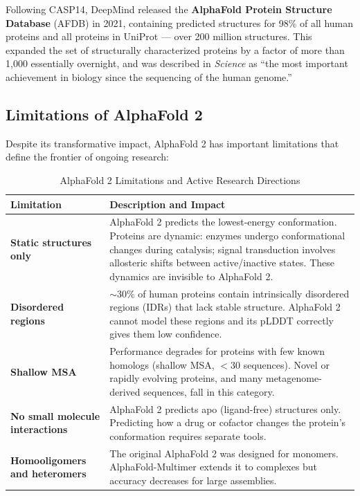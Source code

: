 ﻿\documentclass[12pt,a4paper]{article}
\begin{document}
Following CASP14, DeepMind released the \textbf{AlphaFold Protein Structure Database} (AFDB) in 2021, containing predicted structures for 98\% of all human proteins and all proteins in UniProt --- over 200 million structures. This expanded the set of structurally characterized proteins by a factor of more than 1,000 essentially overnight, and was described in \textit{Science} as ``the most important achievement in biology since the sequencing of the human genome.''

\subsection{Limitations of AlphaFold 2}

Despite its transformative impact, AlphaFold 2 has important limitations that define the frontier of ongoing research:

\begin{table}[H]
\centering
\caption{AlphaFold 2 Limitations and Active Research Directions}
\begin{tabularx}{\textwidth}{>{\bfseries}p{4cm}X}
\toprule
\rowcolor{lightblue}
\textbf{Limitation} & \textbf{Description and Impact} \\
\midrule
Static structures only & AlphaFold 2 predicts the lowest-energy conformation. Proteins are dynamic: enzymes undergo conformational changes during catalysis; signal transduction involves allosteric shifts between active/inactive states. These dynamics are invisible to AlphaFold 2. \\
\addlinespace
\rowcolor{lightblue!20}
Disordered regions & $\sim$30\% of human proteins contain intrinsically disordered regions (IDRs) that lack stable structure. AlphaFold 2 cannot model these regions and its pLDDT correctly gives them low confidence. \\
\addlinespace
Shallow MSA & Performance degrades for proteins with few known homologs (shallow MSA, $< 30$ sequences). Novel or rapidly evolving proteins, and many metagenome-derived sequences, fall in this category. \\
\addlinespace
\rowcolor{lightblue!20}
No small molecule interactions & AlphaFold 2 predicts apo (ligand-free) structures only. Predicting how a drug or cofactor changes the protein's conformation requires separate tools. \\
\addlinespace
Homooligomers and heteromers & The original AlphaFold 2 was designed for monomers. AlphaFold-Multimer extends it to complexes but accuracy decreases for large assemblies. \\
\bottomrule
\end{tabularx}
\end{table}
\end{document}
